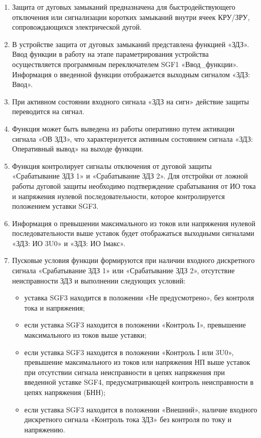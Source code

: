 
\color{black}

\begin{enumerate}

\item
Защита от дуговых замыканий предназначена для быстродействующего отключения или сигнализации коротких замыканий внутри ячеек КРУ/ЗРУ, сопровождающихся электрической дугой.

\item 
В устройстве защита от дуговых замыканий представлена функцией «ЗДЗ». Ввод функции в работу на этапе параметрирования устройства осуществляется программным переключателем SGF1 «Ввод\_функции». Информация о введенной функции отображается выходным сигналом «ЗДЗ: Ввод».

\item
При активном состоянии входного сигнала «ЗДЗ на сигн» действие защиты переводится на сигнал.

\item
Функция может быть выведена из работы оперативно путем активации сигнала «ОВ ЗДЗ», что характеризуется активным состоянием сигнала «ЗДЗ: Оперативный вывод» на выходе функции.

\item\sloppy
Функция контролирует сигналы отключения от дуговой защиты «Срабатывание ЗДЗ 1» и «Срабатывание ЗДЗ 2». Для отстройки от ложной работы дуговой защиты необходимо подтверждение срабатывания от ИО тока и напряжения нулевой последовательности, которое контролируется положением уставки SGF3.

\item
Информация о превышении максимального из токов или напряжения нулевой последовательности выше уставок будет отображаться выходными сигналами «ЗДЗ: ИО 3U0» и «ЗДЗ: ИО Iмакс».

\item
Пусковые условия функции формируются при наличии входного дискретного сигнала «Срабатывание ЗДЗ 1» или «Срабатывание ЗДЗ 2», отсутствие неисправности ЗДЗ и выполнении следующих условий:
\begin{itemize}
    \item уставка SGF3 находится в положении «Не предусмотрено», без контроля тока и напряжения;
    \item если уставка SGF3 находится в положении «Контроль I», превышение максимального из токов выше уставки;
    \item если уставка SGF3 находится в положении «Контроль I или 3U0», превышение максимального из токов или напряжения НП выше уставок при отсутствии сигнала неисправности в цепях напряжения при введенной уставке SGF4,  предусматривающей контроль неисправности в цепях напряжения (БНН);
    \item если уставка SGF3 находится в положении «Внешний», наличие входного дискретного сигнала «Контроль тока ЗДЗ» без контроля по току и напряжению.
\end{itemize}


\end{enumerate}
